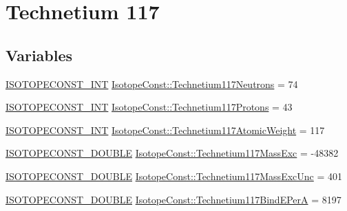 \hypertarget{group___isotope_const-_technetium-_tc117}{}\section{Technetium 117}
\label{group___isotope_const-_technetium-_tc117}
\subsection*{Variables}
\begin{DoxyCompactItemize}
\item 
\mbox{\hyperlink{group___isotope_const-_macros_ga5f18360b3e99483a35c32d789e62621c}{I\+S\+O\+T\+O\+P\+E\+C\+O\+N\+S\+T\+\_\+\+I\+NT}} \mbox{\hyperlink{group___isotope_const-_technetium-_tc117_gafc4ae8e6143844485e4111dcf3596d56}{Isotope\+Const\+::\+Technetium117\+Neutrons}} = 74
\item 
\mbox{\hyperlink{group___isotope_const-_macros_ga5f18360b3e99483a35c32d789e62621c}{I\+S\+O\+T\+O\+P\+E\+C\+O\+N\+S\+T\+\_\+\+I\+NT}} \mbox{\hyperlink{group___isotope_const-_technetium-_tc117_gadb9fa6feb0ea3583c81c6f8a2e508f56}{Isotope\+Const\+::\+Technetium117\+Protons}} = 43
\item 
\mbox{\hyperlink{group___isotope_const-_macros_ga5f18360b3e99483a35c32d789e62621c}{I\+S\+O\+T\+O\+P\+E\+C\+O\+N\+S\+T\+\_\+\+I\+NT}} \mbox{\hyperlink{group___isotope_const-_technetium-_tc117_gac96ed3d25f612852d054ac1f35054216}{Isotope\+Const\+::\+Technetium117\+Atomic\+Weight}} = 117
\item 
\mbox{\hyperlink{group___isotope_const-_macros_ga8f45a7272ce02c0b4c65c44636ed719a}{I\+S\+O\+T\+O\+P\+E\+C\+O\+N\+S\+T\+\_\+\+D\+O\+U\+B\+LE}} \mbox{\hyperlink{group___isotope_const-_technetium-_tc117_ga3fededbb2a623a4c87f8795bcb5a6c59}{Isotope\+Const\+::\+Technetium117\+Mass\+Exc}} = -\/48382
\item 
\mbox{\hyperlink{group___isotope_const-_macros_ga8f45a7272ce02c0b4c65c44636ed719a}{I\+S\+O\+T\+O\+P\+E\+C\+O\+N\+S\+T\+\_\+\+D\+O\+U\+B\+LE}} \mbox{\hyperlink{group___isotope_const-_technetium-_tc117_ga6fc219d2bb465ff5b8bac66f3e7c2cc9}{Isotope\+Const\+::\+Technetium117\+Mass\+Exc\+Unc}} = 401
\item 
\mbox{\hyperlink{group___isotope_const-_macros_ga8f45a7272ce02c0b4c65c44636ed719a}{I\+S\+O\+T\+O\+P\+E\+C\+O\+N\+S\+T\+\_\+\+D\+O\+U\+B\+LE}} \mbox{\hyperlink{group___isotope_const-_technetium-_tc117_ga9e09305b7826761a13e90707399f8c22}{Isotope\+Const\+::\+Technetium117\+Bind\+E\+PerA}} = 8197
\item 

\end{DoxyCompactItemize}
